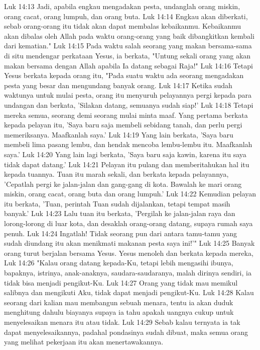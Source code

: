 Luk 14:13  Jadi, apabila engkau mengadakan pesta, undanglah orang miskin, orang cacat, orang lumpuh, dan orang buta.
Luk 14:14  Engkau akan diberkati, sebab orang-orang itu tidak akan dapat membalas kebaikanmu. Kebaikanmu akan dibalas oleh Allah pada waktu orang-orang yang baik dibangkitkan kembali dari kematian."
Luk 14:15  Pada waktu salah seorang yang makan bersama-sama di situ mendengar perkataan Yesus, ia berkata, "Untung sekali orang yang akan makan bersama dengan Allah apabila Ia datang sebagai Raja!"
Luk 14:16  Tetapi Yesus berkata kepada orang itu, "Pada suatu waktu ada seorang mengadakan pesta yang besar dan mengundang banyak orang.
Luk 14:17  Ketika sudah waktunya untuk mulai pesta, orang itu menyuruh pelayannya pergi kepada para undangan dan berkata, 'Silakan datang, semuanya sudah siap!'
Luk 14:18  Tetapi mereka semua, seorang demi seorang mulai minta maaf. Yang pertama berkata kepada pelayan itu, 'Saya baru saja membeli sebidang tanah, dan perlu pergi memeriksanya. Maafkanlah saya.'
Luk 14:19  Yang lain berkata, 'Saya baru membeli lima pasang lembu, dan hendak mencoba lembu-lembu itu. Maafkanlah saya.'
Luk 14:20  Yang lain lagi berkata, 'Saya baru saja kawin, karena itu saya tidak dapat datang.'
Luk 14:21  Pelayan itu pulang dan memberitahukan hal itu kepada tuannya. Tuan itu marah sekali, dan berkata kepada pelayannya, 'Cepatlah pergi ke jalan-jalan dan gang-gang di kota. Bawalah ke mari orang miskin, orang cacat, orang buta dan orang lumpuh.'
Luk 14:22  Kemudian pelayan itu berkata, 'Tuan, perintah Tuan sudah dijalankan, tetapi tempat masih banyak.'
Luk 14:23  Lalu tuan itu berkata, 'Pergilah ke jalan-jalan raya dan lorong-lorong di luar kota, dan desaklah orang-orang datang, supaya rumah saya penuh.
Luk 14:24  Ingatlah! Tidak seorang pun dari antara tamu-tamu yang sudah diundang itu akan menikmati makanan pesta saya ini!'"
Luk 14:25  Banyak orang turut berjalan bersama Yesus. Yesus menoleh dan berkata kepada mereka,
Luk 14:26  "Kalau orang datang kepada-Ku, tetapi lebih mengasihi ibunya, bapaknya, istrinya, anak-anaknya, saudara-saudaranya, malah dirinya sendiri, ia tidak bisa menjadi pengikut-Ku.
Luk 14:27  Orang yang tidak mau memikul salibnya dan mengikuti Aku, tidak dapat menjadi pengikut-Ku.
Luk 14:28  Kalau seorang dari kalian mau membangun sebuah menara, tentu ia akan duduk menghitung dahulu biayanya supaya ia tahu apakah uangnya cukup untuk menyelesaikan menara itu atau tidak.
Luk 14:29  Sebab kalau ternyata ia tak dapat menyelesaikannya, padahal pondasinya sudah dibuat, maka semua orang yang melihat pekerjaan itu akan menertawakannya.
